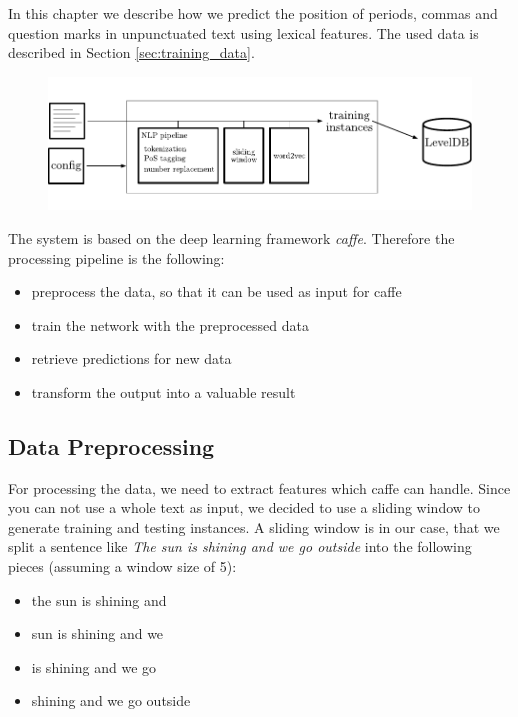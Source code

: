In this chapter we describe how we predict the position of periods, commas and question marks in unpunctuated text using lexical features.
The used data is described in Section \ref{sec:training_data}.

\begin{figure}[ht]
    \centering
    \includegraphics[width=\textwidth]{img/overview_lexical.pdf}
    \caption{}
    \label{fig:overview_lexical}
\end{figure}

The system is based on the deep learning framework \emph{caffe}.
Therefore the processing pipeline is the following:

\begin{itemize}
\item preprocess the data, so that it can be used as input for caffe
\item train the network with the preprocessed data
\item retrieve predictions for new data
\item transform the output into a valuable result
\end{itemize}

\subsection{Data Preprocessing}

For processing the data, we need to extract features which caffe can handle.
Since you can not use a whole text as input, we decided to use a sliding window to generate training and testing instances.
A sliding window is in our case, that we split a sentence like \emph{The sun is shining and we go outside} into the following pieces (assuming a window size of 5):
\begin{itemize}
\item the sun is shining and
\item sun is shining and we
\item is shining and we go
\item shining and we go outside
\end{itemize}

